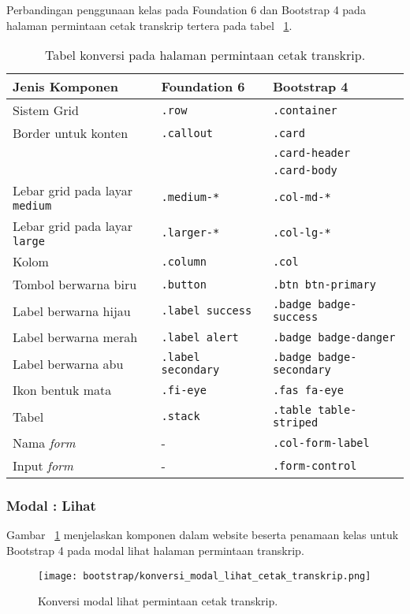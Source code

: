 \noindent Perbandingan penggunaan kelas pada Foundation 6 dan Bootstrap 4 pada halaman permintaan cetak transkrip tertera pada tabel ~\ref{table:konversiPermintaanCetakTranskrip}.\\ 
\begin{table}[H]
	\caption{Tabel konversi pada halaman permintaan cetak transkrip.}
	\begin{tabular}{| p{} | p{} | p{} |} 
		\hline
		\textbf{Jenis Komponen} & \textbf{Foundation 6} & \textbf{Bootstrap 4}  \\ [0.5ex] 
		\hline	
		Sistem Grid & \texttt{.row} &   \texttt{.container} \\ 
		\hline	
		Border untuk konten & \texttt{.callout} &  \texttt{.card }   \\
		&&\texttt{.card-header} \\
		&&\texttt{.card-body} \\
		\hline	
		Lebar grid pada layar \texttt{medium} & \texttt{.medium-*} &  \texttt{.col-md-*}\\
		\hline	
		Lebar grid pada layar \texttt{large} & \texttt{.larger-*} &  \texttt{.col-lg-*} \\
		\hline
		Kolom & \texttt{.column} &  \texttt{.col} \\	
		\hline	
		Tombol berwarna biru & \texttt{.button} &  \texttt{.btn btn-primary}\\
		\hline	
		Label berwarna hijau & \texttt{.label success} &  \texttt{.badge badge-success} \\
		\hline	
		Label berwarna merah & \texttt{.label alert} & \texttt{.badge badge-danger}  \\
		\hline	
		Label berwarna abu & \texttt{.label secondary } & \texttt{.badge badge-secondary } \\
		\hline	
		Ikon bentuk mata & \texttt{.fi-eye} &  \texttt{.fas fa-eye} \\	
		\hline	
		Tabel & \texttt{.stack} & \texttt{.table table-striped}  \\
		\hline	
		Nama \textit{form} & - & \texttt{.col-form-label}  \\ 
		\hline	
		Input \textit{form} & - & \texttt{.form-control}  \\ [1ex] 
		\hline
	\end{tabular}
	\label{table:konversiPermintaanCetakTranskrip}
\end{table}

\subsubsection{Modal : Lihat}
\noindent Gambar ~\ref{fig:konversiLihatPermintaanCetakTranskrip} menjelaskan komponen dalam website beserta penamaan kelas untuk Bootstrap 4 pada modal lihat halaman permintaan transkrip.\\
\begin{figure} [H]
	\centering  
	\texttt{[image: bootstrap/konversi\_modal\_lihat\_cetak\_transkrip.png]}  
	\caption{Konversi modal lihat permintaan cetak transkrip.} 
	\label{fig:konversiLihatPermintaanCetakTranskrip}
\end{figure}

